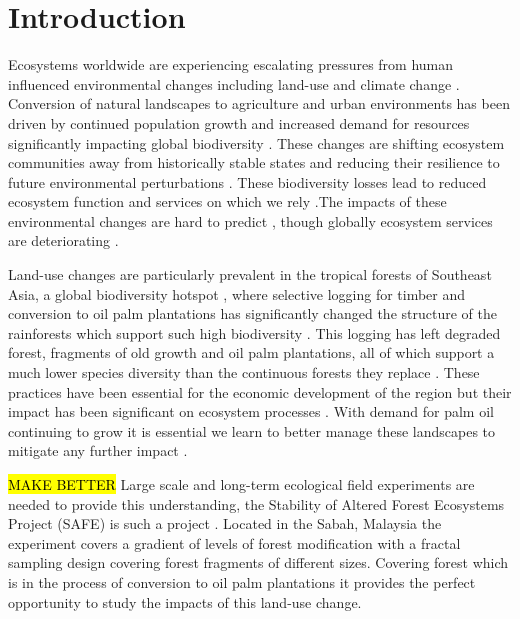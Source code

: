 
\section{Introduction}

Ecosystems worldwide are experiencing escalating pressures from human influenced environmental changes including land-use and climate change \citep{Hautier2015}. Conversion of natural landscapes to agriculture and urban environments has been driven by continued population growth and increased demand for resources \citep{Green2005, Foley2005} significantly impacting global biodiversity \citep{Pimm1995}. These changes are shifting ecosystem communities away from historically stable states \citep{Hautier2015} and reducing their resilience to future environmental perturbations \citep{Oliver2015}. These biodiversity losses lead to reduced ecosystem function and services on which we rely \citep{Diaz2006, MillenniumEcosystemAssessment2005}.The impacts of these environmental changes are hard to predict \citep{Carpenter2009}, though globally ecosystem services are deteriorating \citep{Mace2012}.

Land-use changes are particularly prevalent in the tropical forests of Southeast Asia, a global biodiversity hotspot \citep{DeBruyn2014},  where selective logging for timber and conversion to oil palm plantations has significantly changed the structure of the rainforests which support such high biodiversity \citep{Gibson2011}. This logging has left degraded forest, fragments of old growth and oil palm plantations, all of which support a much lower species diversity than the continuous forests they replace \citep{Fitzherbert2008, Haddad2015} . These practices have been essential for the economic development of the region \citep{Basiron2007} but their impact has been significant on ecosystem processes \citep{Koh2011, Schleuning2011, Ewers2015}.  With demand for palm oil continuing to grow it is essential we learn to better manage these landscapes to mitigate any further impact \citep{Turner2008}.

\hl{MAKE BETTER} Large scale and long-term ecological field experiments are needed to provide this understanding, the Stability of Altered Forest Ecosystems Project (SAFE) is such a project \citep{Ewers2011}. Located in the Sabah, Malaysia the experiment covers a gradient of levels of forest modification with a fractal sampling design covering forest fragments of different sizes. Covering forest which is in the process of conversion to oil palm plantations it provides the perfect opportunity to study the impacts of this land-use change.

